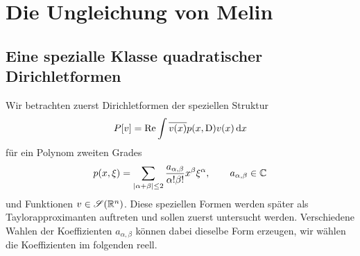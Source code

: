 \chapter{Die Ungleichung von Melin}

\section{Eine spezialle Klasse quadratischer Dirichletformen}
Wir betrachten zuerst Dirichletformen der speziellen Struktur
\begin{equation}
   P[v] = \operatorname{Re}  \int \overline{v(x)}p(x,\mathrm D)v(x)\,\mathrm d x 
\end{equation}
für ein Polynom zweiten Grades
\begin{equation}
    p(x,\xi) = \sum_{|\alpha+\beta|\le 2} \frac{ a_{\alpha,\beta}}{\alpha!\beta!} x^\beta \xi^\alpha,\qquad a_{\alpha,\beta}\in\mathbb C
\end{equation}
und Funktionen $v\in\mathscr S(\mathbb R^n)$. Diese speziellen Formen werden später als Taylorapproximanten auftreten und sollen zuerst untersucht werden. Verschiedene Wahlen der Koeffizienten $a_{\alpha,\beta}$ können dabei dieselbe Form erzeugen, wir wählen die Koeffizienten im folgenden reell.

